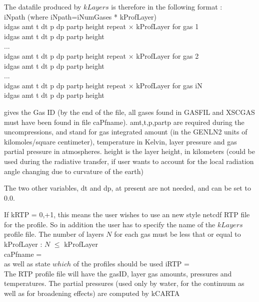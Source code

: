 \documentclass[12pt]{article}
\newcommand{\kc}{\textsf{kCARTA}\xspace}
\newcommand{\ttab}{\indent\indent}
\begin{document}
{The datafile produced by $kLayers$ is therefore in the following format : \\
\medskip
{\sf 
\ttab  iNpath              (where iNpath=iNumGases * kProfLayer)\\
\ttab  idgas amt t dt p dp partp height
\hspace{0.25in} repeat $\times$ kProfLayer  for gas 1\\
\ttab  idgas amt t dt p dp partp height\\
\ttab ...\\
\ttab  idgas amt t dt p dp partp height
\hspace{0.25in} repeat $\times$ kProfLayer for gas 2\\  
\ttab  idgas amt t dt p dp partp height\\
\ttab ...\\
\ttab  idgas amt t dt p dp partp height
\hspace{0.25in} repeat $\times$ kProfLayer  for gas iN\\  
\ttab  idgas amt t dt p dp partp height\\
}

\medskip
{} gives the Gas ID (by the end of the file, all
gases found in GASFIL and XSCGAS must have been found in file
caPfname).  {\sf amt,t,p,partp} are required during the
uncompressions, and stand for gas integrated amount (in the {\sf
GENLN2} units of kilomoles/square centimeter), temperature in
Kelvin, layer pressure and gas partial pressure in atmospheres.
{\sf height} is the layer height, in kilometers (could be used
during the radiative transfer, if user wants to account for the
local radiation angle changing due to curvature of the earth)

The two other variables, {\sf dt} and {\sf dp}, at present are not
needed, and can be set to 0.0.

If kRTP = 0,+1, this means the user wishes to use an new style netcdf RTP
file for the profile. So in addition the user has to specify the name 
of the $kLayers$ profile file. The number of layers $N$ for each gas must
be less that or equal to kProfLayer : $N$ $\le$ kProfLayer\\
{\sf 
\ttab caPfname = \\
}
as well as state $which$ of the profiles should be used
{\sf 
\ttab iRTP = \\
}
The RTP profile file will have the gasID, layer gas amounts, pressures and
temperatures. The partial pressures (used only by water, for the continuum as
well as for broadening effects) are computed by \kc

}
\end{document}

